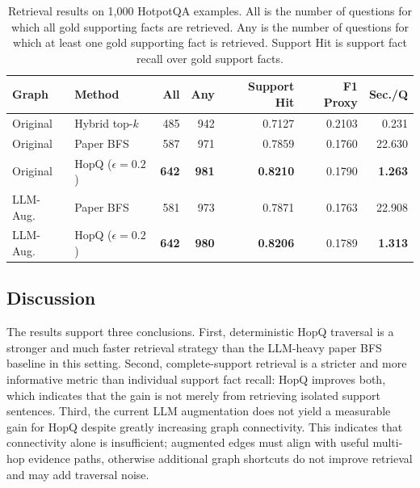 \begin{table}[t]
\centering
\small
\begin{tabular}{llrrrrr}
\hline
Graph & Method & All & Any & Support Hit & F1 Proxy & Sec./Q \\
\hline
Original & Hybrid top-$k$ & 485 & 942 & 0.7127 & 0.2103 & 0.231 \\
Original & Paper BFS & 587 & 971 & 0.7859 & 0.1760 & 22.630 \\
Original & HopQ ($\epsilon=0.2$) & \textbf{642} & \textbf{981} & \textbf{0.8210} & 0.1790 & \textbf{1.263} \\
LLM-Aug. & Paper BFS & 581 & 973 & 0.7871 & 0.1763 & 22.908 \\
LLM-Aug. & HopQ ($\epsilon=0.2$) & \textbf{642} & \textbf{980} & \textbf{0.8206} & 0.1789 & \textbf{1.313} \\
\hline
\end{tabular}
\caption{Retrieval results on 1{,}000 HotpotQA examples. All is the number of questions for which all gold supporting facts are retrieved. Any is the number of questions for which at least one gold supporting fact is retrieved. Support Hit is support fact recall over gold support facts.}
\label{tab:main-retrieval-results}
\end{table}

\subsection{Discussion}
\label{sec:discussion}

The results support three conclusions. First, deterministic HopQ traversal is a
stronger and much faster retrieval strategy than the LLM-heavy paper BFS
baseline in this setting. Second, complete-support retrieval is a stricter and
more informative metric than individual support fact recall: HopQ improves both,
which indicates that the gain is not merely from retrieving isolated support
sentences. Third, the current LLM augmentation does not yield a measurable gain
for HopQ despite greatly increasing graph connectivity. This indicates that
connectivity alone is insufficient; augmented edges must align with useful
multi-hop evidence paths, otherwise additional graph shortcuts do not improve
retrieval and may add traversal noise.
